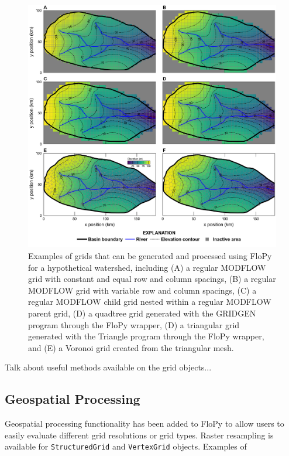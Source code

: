 \documentclass[11pt, oneside]{article}   	%
\begin{document}
\begin{figure}[ht!]
	\begin{center}
		\includegraphics{figures/grids_geoprocessing.png}
	\end{center}
	\caption{Examples of grids that can be generated and processed using FloPy for a hypothetical watershed, including (A) a regular MODFLOW grid with constant and equal row and column spacings, (B) a regular MODFLOW grid with variable row and column spacings, (C) a regular MODFLOW child grid nested within a regular MODFLOW parent grid, (D) a quadtree grid generated with the GRIDGEN program \citep{gridgen} through the FloPy wrapper, (D) a triangular grid generated with the Triangle program \citep{trianglemesh} through the FloPy wrapper, and (E) a Voronoi grid created from the triangular mesh.}\label{fig:grids}
\end{figure}

Talk about useful methods available on the grid objects...

\subsection{Geospatial Processing}

Geospatial processing functionality has been added to FloPy to allow users to easily evaluate different grid resolutions or grid types. Raster resampling is available for \texttt{StructuredGrid} and \texttt{VertexGrid} objects. Examples of   
\end{document}

